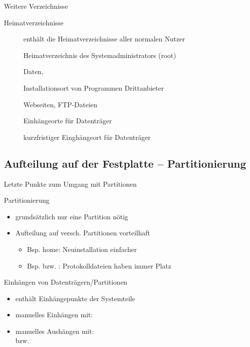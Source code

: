 \documentclass[aspectratio=43]{beamer}
\begin{document}
\begin{frame}{Weitere Verzeichnisse}
  \begin{block}{Heimatverzeichnisse}
    \begin{description}
     \item[] enthält die Heimatverzeichnisse aller normalen Nutzer
     \item[] Heimatverzeichnis des Systemadministrators (root)
    \end{description}
  \end{block}
  \begin{block}{}
    \begin{description}
     \item[] Daten, 
     \item[] Installationsort von Programmen Drittanbieter
     \item[] Webseiten, FTP-Dateien 
     \item[] Einhängeorte für Datenträger
     \item[] kurzfristiger Einghängeort für Datenträger
    \end{description}
  \end{block}
\end{frame}

\subsection{Aufteilung auf der Festplatte -- Partitionierung}
\begin{frame}{Letzte Punkte zum Umgang mit Partitionen}
  \begin{block}{Partitionierung}
 \begin{itemize}
  \item grundsätzlich nur eine Partition nötig
  \item Aufteilung auf versch. Partitionen vorteilhaft
    \begin{itemize}
     \item Bsp. home: Neuinstallation einfacher
     \item Bsp.  bzw. : Protokolldateien haben immer Platz
    \end{itemize}
 \end{itemize}
  \end{block}
  \begin{block}{Einhängen von Datenträgern/Partitionen}
    \begin{itemize}
     \item {} enthält Einhängepunkte der Systemteile
     \item manuelles Einhängen mit:\\
     \item manuelles Aushängen mit:\\
       bzw. 
    \end{itemize}

  \end{block}

\end{frame}
\end{document}
